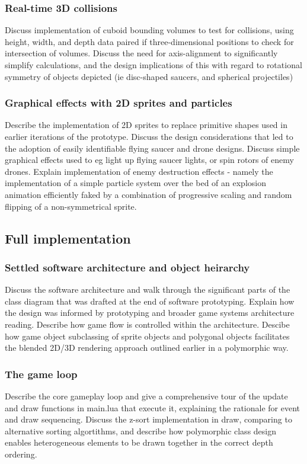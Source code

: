 \documentclass{article}
\begin{document}
\subsubsection*{Real-time 3D collisions}
Discuss implementation of cuboid bounding volumes to test for collisions, using
height, width, and depth data paired if three-dimensional positions to check for
intersection of volumes. Discuss the need for axis-alignment to significantly
simplify calculations, and the design implications of this with regard to rotational
symmetry of objects depicted (ie disc-shaped saucers, and spherical projectiles)
\subsubsection*{Graphical effects with 2D sprites and particles}
Describe the implementation of 2D sprites to replace primitive shapes used in earlier
iterations of the prototype. Discuss the design considerations that led to the
adoption of easily identifiable flying saucer and drone designs. Discuss simple
graphical effects used to eg light up flying saucer lights, or spin rotors of
enemy drones. Explain implementation of enemy destruction effects - namely the
implementation of a simple particle system over the bed of an explosion animation
efficiently faked by a combination of progressive scaling and random flipping of a
non-symmetrical sprite.

\subsection{Full implementation}
\subsubsection*{Settled software architecture and object heirarchy}
Discuss the software architecture and walk through the significant parts of the
class diagram that was drafted at the end of software prototyping. Explain how the
design was informed by prototyping and broader game systems architecture reading.
Describe how game flow is controlled within the architecture. Descibe how game object
subclassing of sprite objects and polygonal objects facilitates the blended
2D/3D rendering approach outlined earlier in a polymorphic way. 
\subsubsection*{The game loop}
Describe the core gameplay loop and give a comprehensive tour of the update and draw
functions in main.lua that execute it, explaining the rationale for event and draw
sequencing. Discuss the z-sort implementation in draw, comparing to alternative sorting
algortithms, and describe how polymorphic class design enables heterogeneous elements
to be drawn together in the correct depth ordering.
\end{document}
